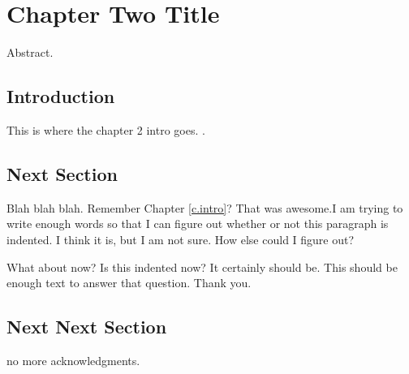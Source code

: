 \chapter{Chapter Two Title}
\label{c.2}

Abstract.

\section{Introduction}

This is where the chapter 2 intro goes.
\cite{williams12}.

\section{Next Section}
Blah blah blah. Remember Chapter \ref{c.intro}? That was awesome.I am trying to write enough words so that I can figure out whether or not this paragraph is indented. I think it is, but I am not sure. How else could I figure out?

What about now? Is this indented now? It certainly should be.  This should be enough text to answer that question.  Thank you.
%

\section{Next Next Section}

no more acknowledgments.
